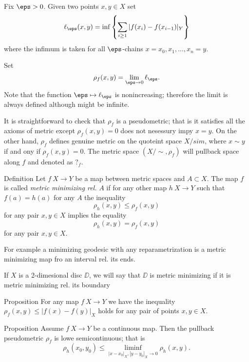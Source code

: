 Fix $\eps>0$.
Given two points $x,y\in X$
set 
\[\ell_\eps(x,y)=\inf\left\{\sum_{i\ge 1}|f(x_i)-f(x_{i-1})|_Y\right\}\]
where the infimum is taken for all $\eps$-chains
$x=x_0,x_1,\dots,x_n=y$.

Set
\[\rho_f(x,y)=\lim_{\eps\to0}\ell_\eps.\]
Note that the function $\eps\mapsto\ell_\eps$ is nonincreasing;
therefore the limit is always defined although might be infinite.

It is straightforward to check that $\rho_f$ is a pseudometric;
that is it satisfies all the axioms of metric except $\rho_f(x,y)=0$ does not nesessury impy $x=y$.
On the other hand, $\rho_f$
defines genuine metric on the quoteint space $X/sim$,
where $x\sim y$ if and ony if $\rho_f(x,y)=0$.
The metric space $(X/\sim,\rho_f)$ will pullback space along $f$
and denoted as $?_f$.

\begin{thm}{Definition}
Let $f\:X\to Y$ be a map between metric spaces
and $A\subset X$.
The map $f$ is called \emph{metric minimizing rel.} $A$
if for any other map $h\: X\to Y$ 
such that $f(a)=h(a)$ for any $A$
the inequality
\[\rho_{h}(x,y)\le \rho_f(x,y)\]
for any pair $x,y\in X$
implies the equality
\[\rho_{h}(x,y)= \rho_f(x,y)\]
for any pair $x,y\in X$.
\end{thm}

For example a minimizing geodesic with any reparametrization is a metric minimizing map fro an interval rel. its ends.

If $X$ is a 2-dimesional disc $\DD$,
we will say that $\DD$ is metric minimizing if it is metric minimizing rel. its boundary

\begin{thm}{Proposition}
For any map $f\:X\to Y$ we have the inequality 
$\rho_f(x,y)\le |f(x)-f(y)|_X$
holds for any pair of points $x,y\in X$.
\end{thm}


\begin{thm}{Proposition}
Assume $f\:X\to Y$ be a continuous map.
Then the pullback pseudometric $\rho_f$ is lowe semicontinuous;
that is
\[\rho_h(x_0,y_0)
\le
\liminf_{|x-x_0|_X,|y-y_0|_X\to 0}
\rho_h(x,y).\]
\end{thm}